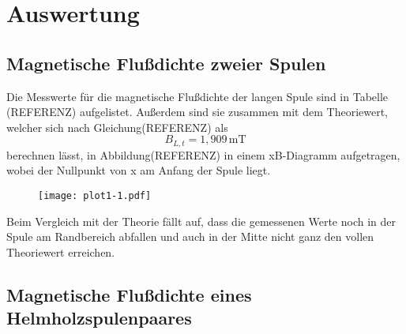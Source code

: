 \section{Auswertung}
\label{sec:Auswertung}
\subsection{Magnetische Flußdichte zweier Spulen}

\begin{table}[H]
  \centering
  \label{tab:messwerte}
\end{table}

Die Messwerte für die magnetische Flußdichte der 
langen Spule sind in Tabelle (REFERENZ) aufgelistet.
Außerdem sind sie zusammen mit dem Theoriewert, welcher
sich nach Gleichung(REFERENZ) als
\begin{equation}
  B_{L,t}=1,909\,\si{\milli\tesla}\nonumber
\end{equation}
berechnen lässt, in Abbildung(REFERENZ) in einem
xB-Diagramm aufgetragen, wobei der Nullpunkt
von x am Anfang der Spule liegt. 

\begin{table}[H]
  \centering
  \label{tab:messwerte}
\end{table}

\begin{figure}[H]
  \texttt{[image: plot1-1.pdf]}
\end{figure}
\noindent Beim Vergleich mit der Theorie fällt auf, dass
die gemessenen Werte noch in der Spule am Randbereich
abfallen und auch in der Mitte nicht ganz den vollen
Theoriewert erreichen.




\subsection{Magnetische Flußdichte eines Helmholzspulenpaares}
